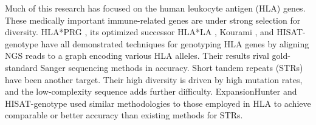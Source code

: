 Much of this research has focused on the human leukocyte antigen (HLA) genes.
These medically important immune-related genes are under strong selection for diversity.
HLA*PRG \cite{dilthey2018hla}, its optimized successor HLA*LA \cite{dilthey2019hla}, Kourami \cite{lee2018kourami}, and HISAT-genotype \cite{Kim_2019} have all demonstrated techniques for genotyping HLA genes by aligning NGS reads to a graph encoding various HLA alleles.
Their results rival gold-standard Sanger sequencing methods in accuracy.
Short tandem repeats (STRs) have been another target.
Their high diversity is driven by high mutation rates, and the low-complexity sequence adds further difficulty.
ExpansionHunter \cite{dolzhenko2019expansionhunter} and HISAT-genotype \cite{Kim_2019} used similar methodologies to those employed in HLA to achieve comparable or better accuracy than existing methods for STRs.
%
%
